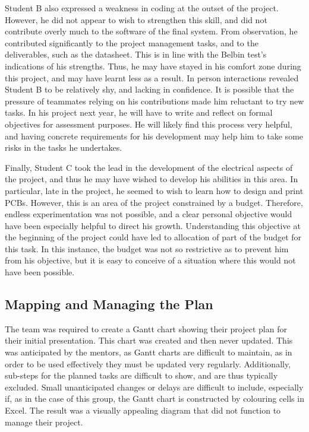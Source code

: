         Student B also expressed a weakness in coding at the outset of the project.
        However, he did not appear to wish to strengthen this skill, and did not contribute overly much to the software of the final system.
        From observation, he contributed significantly to the project management tasks, and to the deliverables, such as the datasheet.
        This is in line with the Belbin test's indications of his strengths.
        Thus, he may have stayed in his comfort zone during this project, and may have learnt less as a result.
        In person interactions revealed Student B to be relatively shy, and lacking in confidence.
        It is possible that the pressure of teammates relying on his contributions made him reluctant to try new tasks.
        In his project next year, he will have to write and reflect on formal objectives for assessment purposes.
        He will likely find this process very helpful, and having concrete requirements for his development may help him to take some risks in the tasks he undertakes.

        Finally, Student C took the lead in the development of the electrical aspects of the project, and thus he may have wished to develop his abilities in this area.
        In particular, late in the project, he seemed to wish to learn how to design and print PCBs.
        However, this is an area of the project constrained by a budget.
        Therefore, endless experimentation was not possible, and a clear personal objective would have been especially helpful to direct his growth.
        Understanding this objective at the beginning of the project could have led to allocation of part of the budget for this task.
        In this instance, the budget was not so restrictive as to prevent him from his objective, but it is easy to conceive of a situation where this would not have been possible.

    \subsection{Mapping and Managing the Plan}\label{subsec:management-plan}
        The team was required to create a Gantt chart showing their project plan for their initial presentation.
        This chart was created and then never updated.
        This was anticipated by the mentors, as Gantt charts are difficult to maintain, as in order to be used effectively they must be updated very regularly.
        Additionally, sub-steps for the planned tasks are difficult to show, and are thus typically excluded.
        Small unanticipated changes or delays are difficult to include, especially if, as in the case of this group, the Gantt chart is constructed by colouring cells in Excel.
        The result was a visually appealing diagram that did not function to manage their project.

